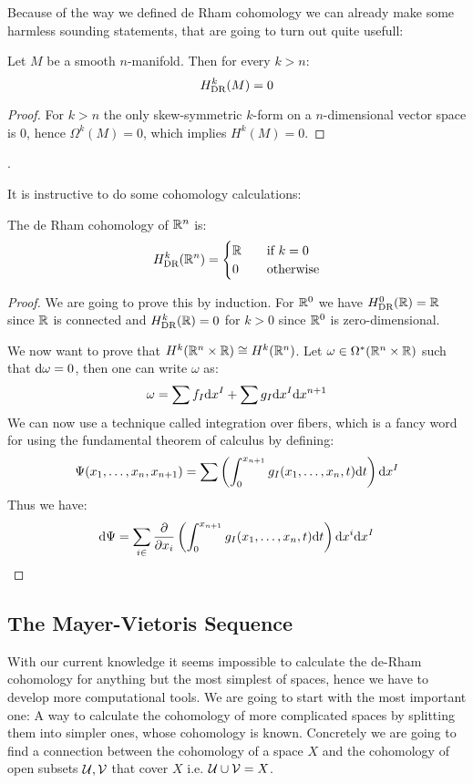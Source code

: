 Because of the way we defined de Rham cohomology we can already make some harmless sounding statements, that are
going to turn out quite usefull:
\begin{lemma}
Let $M$ be a smooth $n$-manifold. Then for every $k > n$:
\[
	H^k_{\text{DR}}(M) = 0
\]
\end{lemma}
\begin{proof}
For $k > n$ the only skew-symmetric $k$-form on a $n$-dimensional vector space is $0$, hence
$\Omega^k(M) = 0$, which implies $H^k(M) = 0$.
\end{proof}.

It is instructive to do some cohomology calculations:
\begin{lemma}
	The de Rham cohomology of $\mathbb{R}^n$ is:
	\begin{align*}
		H^k_{\text{DR}}(\mathbb{R}^n) = \begin{cases}
			\mathbb{R} &\quad\text{if } k = 0 \\
			0   &\quad\text{otherwise}
		\end{cases}
	\end{align*}
\end{lemma}
\begin{proof}
We are going to prove this by induction. For $\mathbb{R}^0$ we have $H^0_{\text{DR}}(\mathbb{R}) = \mathbb{R}$ since $\mathbb{R}$ is connected
and $H^k_{\text{DR}}(\mathbb{R}) = 0$ for $k > 0$ since $\mathbb{R}^0$ is zero-dimensional.

We now want to prove that $H^k(\mathbb{R}^n \times \mathbb{R}) \cong H^k(\mathbb{R}^n)$. Let
$\omega \in \Omega^*(\mathbb{R}^n \times \mathbb{R})$ such that $\mathrm{d} \omega = 0$, then one can write $\omega$ as:
\begin{align*}
	\omega = \sum f_I \mathrm{d} x^{I} + \sum g_I\mathrm{d} x^{I}\mathrm{d} x^{n + 1}
\end{align*}
We can now use a technique called integration over fibers, which is a fancy word for using the fundamental 
theorem of calculus by defining:
\begin{align*}
	\Psi(x_1, \dots, x_n, x_{n + 1}) = \sum \left(\int_0^{x_{n + 1}} g_I(x_1, \dots, x_n, t) \mathrm{d} t \right) \mathrm{d} x^{I}
\end{align*}
Thus we have:
\begin{align*}
	\mathrm{d} \Psi = \sum_{i \in } \frac{\partial }{\partial x_{i}} \left(\int_0^{x_{n + 1}} g_I(x_1, \dots, x_n, t) \mathrm{d} t \right) \mathrm{d} x^{i}\mathrm{d} x^{I}
\end{align*}
\end{proof}
\subsection{The Mayer-Vietoris Sequence}
With our current knowledge it seems impossible to calculate the de-Rham cohomology for anything but the most simplest of
spaces, hence we have to develop more computational tools. We are going to start with the most important one: A way to
calculate the cohomology of more complicated spaces by splitting them into simpler ones, whose cohomology is known.
Concretely we are going to find a connection between the cohomology of a space $X$ and the cohomology of open subsets $\mathcal{U}, \mathcal{V}$ that cover $X$
i.e. $\mathcal{U} \cup \mathcal{V} = X$.

